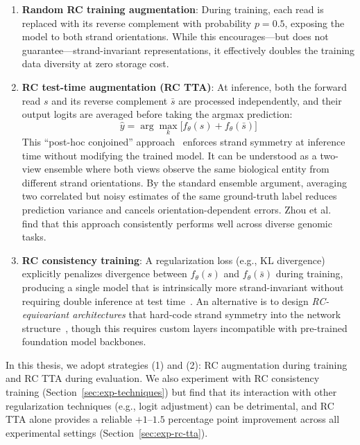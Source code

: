 \begin{enumerate}
    \item \textbf{Random RC training augmentation}: During training, each read is replaced with its reverse complement with probability $p=0.5$, exposing the model to both strand orientations. While this encourages---but does not guarantee---strand-invariant representations, it effectively doubles the training data diversity at zero storage cost.

    \item \textbf{RC test-time augmentation (RC TTA)}: At inference, both the forward read $s$ and its reverse complement $\bar{s}$ are processed independently, and their output logits are averaged before taking the argmax prediction:
    \begin{equation}
        \hat{y} = \arg\max_k \bigl[ f_\theta(s) + f_\theta(\bar{s}) \bigr]
        \label{eq:rc-tta-bg}
    \end{equation}
    This ``post-hoc conjoined'' approach~\cite{Zhou2022rc} enforces strand symmetry at inference time without modifying the trained model. It can be understood as a two-view ensemble where both views observe the same biological entity from different strand orientations. By the standard ensemble argument, averaging two correlated but noisy estimates of the same ground-truth label reduces prediction variance and cancels orientation-dependent errors. Zhou et al.~\cite{Zhou2022rc} find that this approach consistently performs well across diverse genomic tasks.

    \item \textbf{RC consistency training}: A regularization loss (e.g., KL divergence) explicitly penalizes divergence between $f_\theta(s)$ and $f_\theta(\bar{s})$ during training, producing a single model that is intrinsically more strand-invariant without requiring double inference at test time~\cite{Ma2025rc}. An alternative is to design \emph{RC-equivariant architectures} that hard-code strand symmetry into the network structure~\cite{Brown2021rc}, though this requires custom layers incompatible with pre-trained foundation model backbones.
\end{enumerate}

In this thesis, we adopt strategies (1) and (2): RC augmentation during training and RC TTA during evaluation. We also experiment with RC consistency training (Section~\ref{sec:exp-techniques}) but find that its interaction with other regularization techniques (e.g., logit adjustment) can be detrimental, and RC TTA alone provides a reliable $+1$--$1.5$ percentage point improvement across all experimental settings (Section~\ref{sec:exp-rc-tta}).

